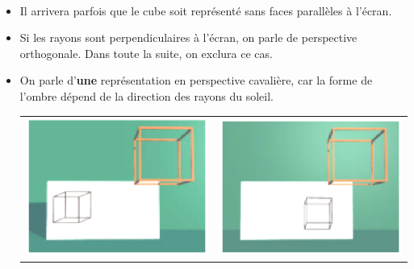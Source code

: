 \begin{rmqs}~
\begin{itemize}
\item Il arrivera parfois que le cube soit représenté sans faces parallèles à l'écran.
\item Si les rayons sont perpendiculaires à l'écran, on parle de perspective orthogonale. Dans toute la suite, on exclura ce cas.
\item On parle d'\textbf{une} représentation en perspective cavalière, car la forme de l'ombre dépend de la direction des rayons du soleil.
      \begin{center}
	  \begin{tabular}{cc}
	  \includegraphics[scale=0.66]{./Graphiques/Perspective2.eps}&\includegraphics[scale=0.66]{./Graphiques/Perspective3.eps}
	  \end{tabular}
      \end{center}

\end{itemize}
\end{rmqs}

